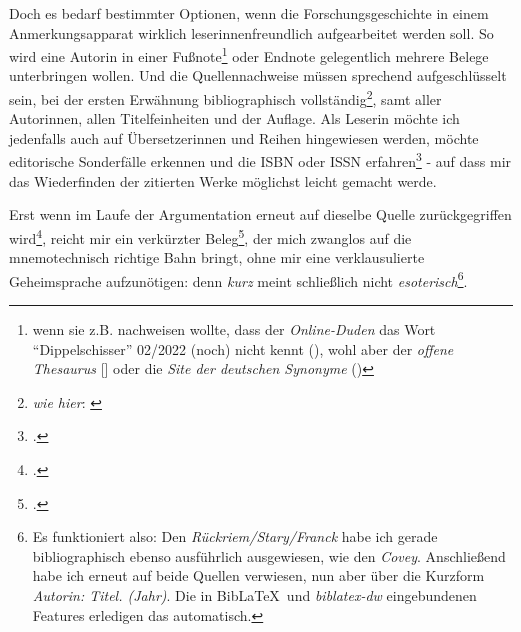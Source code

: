 Doch es bedarf bestimmter Optionen, wenn die Forschungsgeschichte in einem Anmerkungsapparat wirklich leserinnenfreundlich aufgearbeitet werden soll. So wird eine Autorin in einer Fußnote\footnote{wenn sie z.B. nachweisen wollte, dass der \emph{Online-Duden} das Wort \enquote{Dippelschisser} 02/2022 (noch) nicht kennt (\cite[vgl.][]{DudenOnline2022a}), wohl aber der \emph{offene Thesaurus} [\cite[vgl.][]{OpenThesaurus2022a}] oder die \emph{Site der deutschen Synonyme} (\cite[vgl.][]{DeutscheSynonyme2022a})} oder Endnote gelegentlich mehrere Belege unterbringen wollen. Und die Quellennachweise müssen sprechend aufgeschlüsselt sein, bei der ersten Erwähnung bibliographisch vollständig\footnote{\emph{wie hier}: \cite[vgl.][S. 195ff]{RueStaFra1980a}}, samt aller Autorinnen, allen Titelfeinheiten und der Auflage. Als Leserin möchte ich jedenfalls auch auf Übersetzerinnen und Reihen hingewiesen werden, möchte editorische Sonderfälle erkennen und die ISBN oder ISSN erfahren\footcite[\emph{wie hier}: vgl.][]{Covey2006a} - auf dass mir das Wiederfinden der zitierten Werke möglichst leicht gemacht werde.

Erst wenn im Laufe der Argumentation erneut auf dieselbe Quelle zurückgegriffen wird\footcite[\emph{wie hier}: vgl. dazu][194]{RueStaFra1980a}, reicht mir ein verkürzter Beleg\footcite[\emph{wie hier}: vgl.][]{Covey2006a}, der mich zwanglos auf die mnemotechnisch richtige Bahn bringt, ohne mir eine verklausulierte Geheimsprache aufzunötigen: denn \emph{kurz} meint schließlich nicht \emph{esoterisch}\footnote{Es funktioniert also: Den \emph{Rückriem/Stary/Franck} habe ich gerade bibliographisch ebenso ausführlich ausgewiesen, wie den \emph{Covey}. Anschließend habe ich erneut auf beide Quellen verwiesen, nun aber über die Kurzform \emph{Autorin: Titel. (Jahr)}. Die in Bib\LaTeX\ und \emph{biblatex-dw} eingebundenen Features erledigen das automatisch.}.

